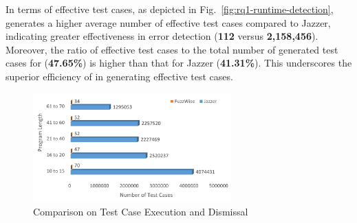 

In terms of effective test cases, as depicted in
Fig.~\ref{fig:rq1-runtime-detection}, {\tool} generates a higher
average number of effective test cases compared to Jazzer, indicating
greater effectiveness in error detection ({\bf 112} versus {\bf
  2,158,456}). Moreover, the ratio of effective test cases to the total
number of generated test cases for {\tool} ({\bf 47.65\%}) is higher than
that for Jazzer ({\bf 41.31\%}). This underscores the superior efficiency
of {\tool} in generating effective test cases.

\begin{figure}
\begin{center}
\includegraphics[width=3in]{RQ1b_Discarded Test Cases.png}
\vspace{-20pt}
\caption{Comparison on Test Case Execution and Dismissal}
\label{fig:rq1-agt-aet-adt-graph}
\end{center}
\end{figure}

